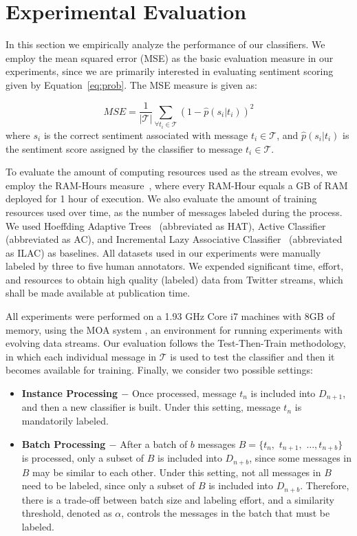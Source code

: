 \section{Experimental Evaluation}

In this section we empirically analyze the performance of our classifiers. We employ the mean squared error (MSE) as the basic evaluation measure in our experiments, since we are primarily interested in evaluating sentiment scoring given by Equation~\ref{eq:prob}. The MSE measure is given as: 

\begin{equation}
\label{rmse}
\mathit{MSE} = \frac{1}{|\mathcal{T}|} \displaystyle\sum_{\forall t_i\in\mathcal{T}} (1 - \hat{p}(s_i|t_i))^2
\end{equation}
\noindent where $s_i$ is the correct sentiment associated with message $t_i\in\mathcal{T}$, and $\hat{p}(s_i|t_i)$ is the sentiment score assigned by the classifier to message $t_i\in\mathcal{T}$.

To evaluate the amount of computing resources used as the stream evolves, we employ the RAM-Hours measure~\cite{Bifet:2010:FPD:2144032.2144069}, where every RAM-Hour equals a GB of RAM deployed for 1 hour of execution. We also evaluate the amount of training resources used over time, as the number of messages labeled during the process. We used Hoeffding Adaptive Trees~\cite{bifetsent1,bifetsent2} (abbreviated as HAT), Active Classifier~\cite{6414645,Indre2011k} (abbreviated as AC), and Incremental Lazy Associative Classifier~\cite{sigir} (abbreviated as ILAC) as baselines. All datasets used in our experiments were manually labeled by three to five human annotators.
We expended significant time, effort,
and resources to obtain high quality (labeled) data from Twitter streams,
which shall be made available at publication time.

All experiments were performed on a 1.93 GHz Core i7 machines with 8GB of memory, using the MOA system \cite{moa}, an environment for running experiments with evolving data streams.
Our evaluation follows the Test-Then-Train methodology, in which 
each individual message in $\mathcal{T}$ is used to test the classifier
and then it becomes available for training.
Finally, we consider two possible settings: 
\begin{itemize}
\item{\bf{Instance Processing $-$}}
Once processed, message $t_n$ is included into $D_{n+1}$, and then a new classifier is built. Under this setting, message $t_n$ is mandatorily labeled.
\item{\bf{Batch Processing $-$}}
After a batch of $b$ messages $B=\{t_n,$ $t_{n+1},$ $\ldots, t_{n+b}\}$ is processed, only a subset of $B$ is included into $D_{n+b}$, since some messages in $B$ may be similar to each other. Under this setting, not all messages in $B$ need to be labeled, since only a subset of $B$ is included into $D_{n+b}$. Therefore, there is a trade-off between batch size and labeling effort, and a similarity threshold, denoted as $\alpha$, controls the messages in the batch that must be labeled.
\end{itemize}

